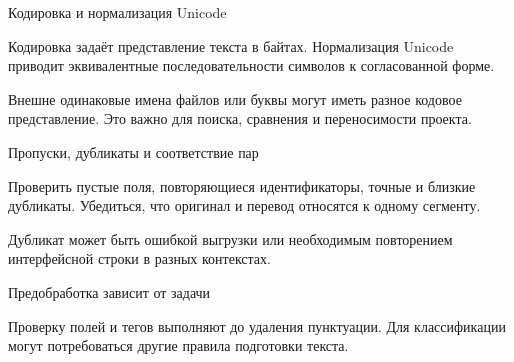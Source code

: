 \documentclass[aspectratio=169,12pt]{beamer}
\begin{document}
\begin{frame}{Кодировка и нормализация Unicode}
\color{ink}
{\small Кодировка задаёт представление текста в байтах. Нормализация Unicode приводит эквивалентные последовательности символов к согласованной форме.
\par\vspace{0.6em}Внешне одинаковые имена файлов или буквы могут иметь разное кодовое представление. Это важно для поиска, сравнения и переносимости проекта.}
\end{frame}

\begin{frame}{Пропуски, дубликаты и соответствие пар}
\color{ink}
{\small Проверить пустые поля, повторяющиеся идентификаторы, точные и близкие дубликаты. Убедиться, что оригинал и перевод относятся к одному сегменту.
\par\vspace{0.6em}Дубликат может быть ошибкой выгрузки или необходимым повторением интерфейсной строки в разных контекстах.}
\end{frame}

\begin{frame}{Предобработка зависит от задачи}
\color{ink}
\begin{center}\end{center}{\small Проверку полей и тегов выполняют до удаления пунктуации. Для классификации могут потребоваться другие правила подготовки текста.}
\end{frame}
\end{document}
